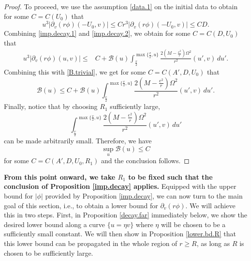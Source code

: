 \documentclass[12 pt, reqno]{amsart}
\theoremstyle{definition}
\theoremstyle{remark}
\numberwithin{equation}{section}
\newcommand{\rd}{\partial}
\newcommand{\0}{\emptyset}
\newcommand{\Omg}{\Omega}
\newcommand{\f}{\frac}
\begin{document}
\begin{proof}
To proceed, we use the assumption \eqref{data.1} on the initial data to obtain for some $C=C(U_0)$ that
\begin{equation}\label{imp.decay.2}
u^3|\rd_v(r\phi)({-U_0},v)|\leq Cr^3|\rd_v(r\phi)({-U_0},v)|\leq CD.
\end{equation}
Combining \eqref{imp.decay.1} and \eqref{imp.decay.2}, we obtain for some $C=C(D,U_0)$ that
\begin{equation*}
\begin{split}
u^3|\rd_v(r\phi)(u,v)|\leq &C+\mathcal B(u) \int_{\f v2}^{\max\{\f v2,u\}} \f{2(M-\f{e^2}{r})\Omg^2}{r^2}(u',v)\,du'.
\end{split}
\end{equation*}
Combining this with \eqref{B.trivial}, we get for some $C=C(A',D,U_0)$ that
$$\mathcal B(u)\leq C+\mathcal B(u) \int_{\f v2}^{\max\{\f v2,u\}} \f{2(M-\f{e^2}{r})\Omg^2}{r^2}(u',v)\,du'.$$
Finally, notice that by choosing $R_1$ sufficiently large, 
$$\int_{\f v2}^{\max\{\f v2,u\}} \f{2(M-\f{e^2}{r})\Omg^2}{r^2}(u',v)\,du'$$
can be made arbitrarily small. Therefore, we have
$$\sup_u\mathcal B(u)\leq C$$
for some $C=C(A',D,U_0,R_1)$ and the conclusion follows.
\end{proof}

{\bf From this point onward, we take $R_1$ to be fixed such that the conclusion of Proposition \ref{imp.decay} applies.} Equipped with the upper bound for $|\phi|$ provided by Proposition \ref{imp.decay}, we can now turn to the main goal of this section, i.e., to obtain a lower bound for $\rd_v(r\phi)$. We will achieve this in two steps. First, in Proposition \ref{decay.far} immediately below, we show the desired lower bound along a curve $\{u=\eta v\}$ where $\eta$ will be chosen to be a sufficiently small constant. We will then show in Proposition \ref{lower.bd.R} that this lower bound can be propagated in the whole region of $r\geq R$, as long as $R$ is chosen to be sufficiently large. 
\end{document}
